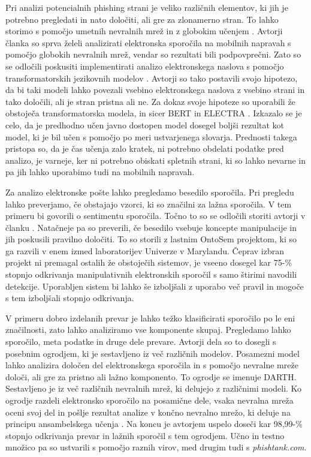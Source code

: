 \documentclass[sigconf,nonacm]{acmart}
\begin{document}
Pri analizi potencialnih phishing \cite{rekouche2011early} strani je veliko različnih elementov, ki jih je potrebno pregledati in nato določiti, ali gre za zlonamerno stran. To lahko storimo s pomočjo umetnih nevralnih mrež \cite{Zou2009} in z globokim učenjem \cite{lecun2015deep}. Avtorji članka \cite{HAYNES2021127} so sprva želeli analizirati elektronska sporočila na mobilnih napravah s pomočjo globokih nevralnih mrež, vendar so rezultati bili podpovprečni. Zato so se odločili poskusiti implementirati analizo elektronskega naslova s pomočjo transformatorskih jezikovnih modelov \cite{9222960}. Avtorji so tako postavili svojo hipotezo, da bi taki modeli lahko povezali vsebino elektronskega naslova z vsebino strani in tako določili, ali je stran pristna ali ne.  Za dokaz svoje hipoteze so uporabili že obstoječa transformatorska modela, in sicer BERT \cite{devlin2018bert} in ELECTRA \cite{clark2020electra}. Izkazalo se je celo, da je predhodno učen javno dostopen model dosegel boljši rezultat kot model, ki je bil učen s pomočjo po meri ustvarjenega slovarja. Prednosti takega pristopa so, da je čas učenja zalo kratek, ni potrebno obdelati podatke pred analizo, je varneje, ker ni potrebno obiskati spletnih strani, ki so lahko nevarne in pa jih lahko uporabimo tudi na mobilnih napravah. 

Za analizo elektronske pošte lahko pregledamo besedilo sporočila. Pri pregledu lahko preverjamo, če obstajajo vzorci, ki so značilni za lažna sporočila. V tem primeru bi govorili o sentimentu sporočila. Točno to so se odločili storiti avtorji v članku \cite{stone2007ebids}. Natačneje pa so preverili, če besedilo vsebuje koncepte manipulacije in jih poskusili pravilno določiti. To so storili z lastnim OntoSem projektom, ki so ga razvili v enem izmed laboratorijev Univerze v Marylandu. Čeprav izbran projekt ni premagal ostalih že obstoječih sistemov, je vseeno dosegel kar 75-\% stopnjo odkrivanja manipulativnih elektronskih sporočil s samo štirimi navodili detekcije. Uporabljen sistem bi lahko še izboljšali z uporabo več pravil in mogoče s tem izboljšali stopnjo odkrivanja. 

V primeru dobro izdelanih prevar je lahko težko klasificirati sporočilo po le eni značilnosti, zato lahko analiziramo vse komponente skupaj. Pregledamo lahko sporočilo, meta podatke in druge dele prevare. Avtorji dela \cite{mittal2022phishing} so to dosegli s posebnim ogrodjem, ki je sestavljeno iz več različnih modelov. Posamezni model lahko analizira določen del elektronskega sporočila in s pomočjo nevralne mreže določi, ali gre za pristno ali lažno komponento. To ogrodje se imenuje DARTH. Sestavljeno je iz več različnih nevralnih mrež, ki delujejo z različnimi modeli. Ko ogrodje razdeli elektronsko sporočilo na posamične dele, vsaka nevralna mreža oceni svoj del in pošlje rezultat analize v končno nevralno mrežo, ki deluje na principu ansambelskega učenja \cite{682375}. Na koncu je avtorjem uspelo doseči kar 98,99-\% stopnjo odkrivanja prevar in lažnih sporočil s tem ogrodjem. Učno in testno množico pa so ustvarili s pomočjo raznih virov, med drugim tudi s \emph{phishtank.com}.
\end{document}
